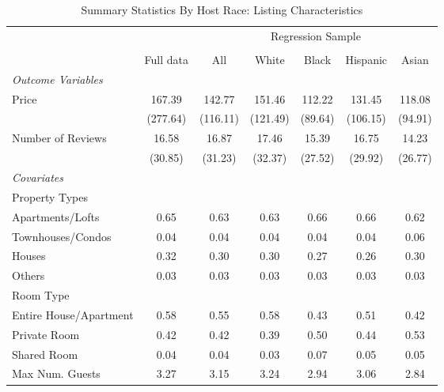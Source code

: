 \begin{table}[htbp]
\caption{Summary Statistics By Host Race: Listing Characteristics}
\begin{center}%
\small\begin{tabular}{l c | c | c c c c}
& \multicolumn{1}{c}{} & \multicolumn{5}{c}{Regression Sample}
\\
 \cmidrule(r){3-7}
\\
 & \multicolumn{1}{c}{Full data} & \multicolumn{1}{c}{All} & White & Black & Hispanic & Asian
\\
\hline\hline\noalign{\smallskip} 
 \textit{\textit{Outcome Variables}} & & & & & & \\ Price & 167.39 & 142.77 & 151.46 & 112.22 & 131.45 & 118.08 \\
 & (277.64) & (116.11) & (121.49) & (89.64) & (106.15) & (94.91) \\
 Number of Reviews & 16.58 & 16.87 & 17.46 & 15.39 & 16.75 & 14.23 \\
 & (30.85) & (31.23) & (32.37) & (27.52) & (29.92) & (26.77) \\
 \textit{Covariates} & & & & & & \\ \hline Property Types & & & & & & \\ \hspace{10bp}Apartments/Lofts    & 0.65 & 0.63 & 0.63 & 0.66 & 0.66 & 0.62 \\ \hspace{10bp}Townhouses/Condos   & 0.04 & 0.04 & 0.04 & 0.04 & 0.04 & 0.06 \\ \hspace{10bp}Houses                      & 0.32 & 0.30 & 0.30 & 0.27 & 0.26 & 0.30 \\ \hspace{10bp}Others                              & 0.03 & 0.03 & 0.03 & 0.03 & 0.03 & 0.03 \\Room Type &&&&&& \\ \hspace{10bp}Entire House/Apartment      & 0.58 & 0.55 & 0.58 & 0.43 & 0.51 & 0.42 \\ \hspace{10bp}Private Room                        & 0.42 & 0.42 & 0.39 & 0.50 & 0.44 & 0.53 \\ \hspace{10bp}Shared Room                         & 0.04 & 0.04 & 0.03 & 0.07 & 0.05 & 0.05 \\ Max Num. Guests & 3.27 & 3.15 & 3.24 & 2.94 & 3.06 & 2.84 \\

\end{tabular}
\end{center}
\end{table}
